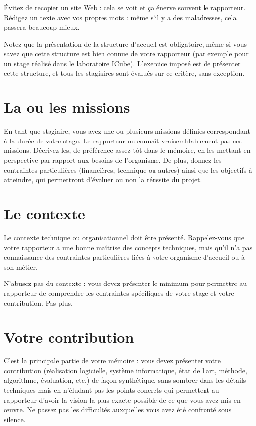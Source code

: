 \documentclass [twoside,openright,a4paper,11pt,french] {report}
\begin{document}
Évitez de recopier un site Web : cela se voit et ça énerve souvent
le rapporteur. Rédigez un texte avec vos propres mots : même s'il y a
des maladresses, cela passera beaucoup mieux.

Notez que la présentation de la structure d'accueil est obligatoire,
même si vous savez que cette structure est bien connue de votre
rapporteur (par exemple pour un stage réalisé dans le laboratoire
ICube). L'exercice imposé est de présenter cette structure, et tous
les stagiaires sont évalués sur ce critère, sans exception.

\section {La ou les missions}
    \label {sec:mission}

En tant que stagiaire, vous avez une ou plusieurs missions définies
correspondant à la durée de votre stage. Le rapporteur ne connaît
vraisemblablement pas ces missions. Décrivez les, de préférence assez
tôt dans le mémoire, en les mettant en perspective par rapport aux
besoins de l'organisme. De plus, donnez les contraintes particulières
(financières, technique ou autres) ainsi que les objectifs à atteindre,
qui permettront d'évaluer ou non la réussite du projet.

\section {Le contexte}

Le contexte technique ou organisationnel doit être présenté.
Rappelez-vous que votre rapporteur a une bonne maîtrise des concepts
techniques, mais qu'il n'a pas connaissance des contraintes particulières
liées à votre organisme d'accueil ou à son métier.

N'abusez pas du contexte : vous devez présenter le minimum pour permettre
au rapporteur de comprendre les contraintes spécifiques de votre stage
et votre contribution. Pas plus.


\section {Votre contribution}

C'est la principale partie de votre mémoire : vous devez présenter votre
contribution (réalisation logicielle, système informatique, état de
l'art, méthode, algorithme, évaluation, etc.) de façon synthétique,
sans sombrer dans les détails techniques mais en n'éludant pas les
points concrets qui permettent au rapporteur d'avoir la vision la plus
exacte possible de ce que vous avez mis en œuvre. Ne passez pas
les difficultés auxquelles vous avez été confronté sous silence.
\end{document}
